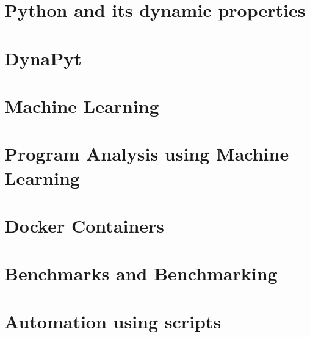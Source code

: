 \section{Python and its dynamic properties}
\section{DynaPyt}
\section{Machine Learning}
\section{Program Analysis using Machine Learning}
\section{Docker Containers}
\section{Benchmarks and Benchmarking}
\section{Automation using scripts}